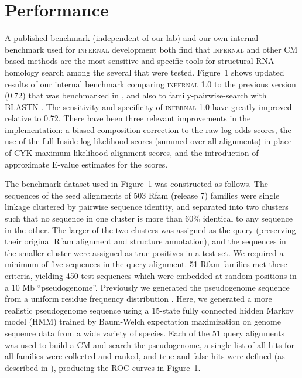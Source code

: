 
\section{Performance}


A published benchmark (independent of our lab) \citep{Freyhult07} and
our own internal benchmark used for \textsc{infernal} development
\citep{NawrockiEddy07} both find that \textsc{infernal} and other CM
based methods are the most sensitive and specific tools for structural
RNA homology search among the several that were tested. Figure~1 shows
updated results of our internal benchmark comparing \textsc{infernal}
1.0 to the previous version (0.72) that was benchmarked in
\citep{Freyhult07}, and also to family-pairwise-search with BLASTN
\citep{Altschul97,Grundy98b}.  The sensitivity and specificity of
\textsc{infernal} 1.0 have greatly improved relative to 0.72. There
have been three relevant improvements in the implementation: a biased
composition correction to the raw log-odds scores, the use of the full
Inside log-likelihood scores (summed over all alignments) in place of
CYK maximum likelihood alignment scores, and the introduction of
approximate E-value estimates for the scores.

The benchmark dataset used in Figure~1 
was constructed as follows. The sequences of the seed
alignments of 503 Rfam (release 7) families were single linkage
clustered by pairwise sequence identity, and separated into two
clusters such that no sequence in one cluster is more than 60\%
identical to any sequence in the other. The larger of the two clusters
was assigned as the query (preserving their original Rfam alignment
and structure annotation), and the sequences in the smaller cluster
were assigned as true positives in a test set. We required a minimum
of five sequences in the query alignment. 51 Rfam families met these
criteria, yielding 450 test sequences which were embedded at random
positions in a 10 Mb ``pseudogenome''.  Previously we generated the
pseudogenome sequence from a uniform residue frequency distribution \citep{NawrockiEddy07}.
Here, we generated a more realistic pseudogenome sequence using a
15-state fully connected hidden Markov model (HMM) trained by
Baum-Welch expectation maximization \citep{Durbin98} on genome
sequence data from a wide variety of species.  Each of the 51 query
alignments was used to build a CM and search the pseudogenome, a
single list of all hits for all families were collected and ranked,
and true and false hits were defined (as described in
\citep{NawrockiEddy07}), producing the ROC curves in Figure~1.

